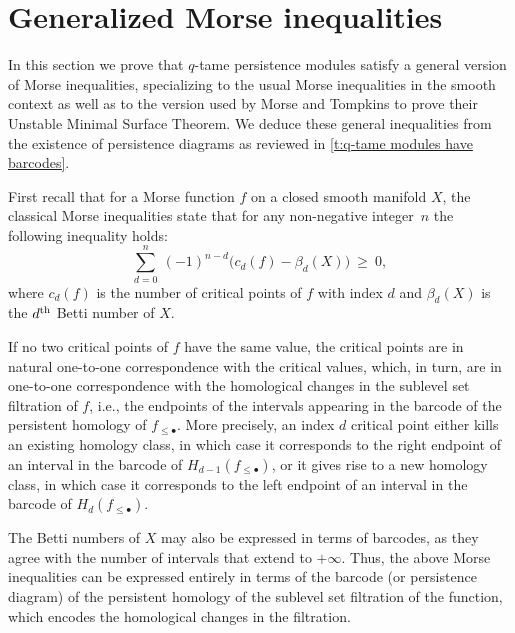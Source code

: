 
\section{Generalized Morse inequalities} \label{s:inequalities}

In this section we prove that $q$-tame persistence modules satisfy a general version of Morse inequalities, specializing to the usual Morse inequalities in the smooth context as well as to the version used by Morse and Tompkins to prove their Unstable Minimal Surface Theorem.
We deduce these general inequalities from the existence of persistence diagrams as reviewed in \cref{t:q-tame modules have barcodes}.

First recall that for a Morse function $f$ on a closed smooth manifold $X$, the classical Morse inequalities \cite{Morse.1925} state that for any non-negative integer~$n$ the following inequality holds:
\begin{equation} \label{e:classical morse inequalities}
\sum_{d=0}^n \ (-1)^{n-d} \big( c_{d}(f) - \beta_{d}(X) \big) \ \geq \ 0,
\end{equation}
where $c_d(f)$ is the number of critical points of $f$ with index $d$ and $\beta_{d}(X)$ is the $d^{\mathrm{th}}$ Betti number of $X$.

If no two critical points of $f$ have the same value, the critical points are in natural one-to-one correspondence with the critical values, which, in turn, are in one-to-one correspondence with the homological changes in the sublevel set filtration of $f$, i.e., the endpoints of the intervals appearing in the barcode of the persistent homology of $f_{\leq \bullet}$.
More precisely, an index $d$ critical point either kills an existing homology class, in which case it corresponds to the right endpoint of an interval in the barcode of $H_{d-1}(f_{\leq \bullet})$, or it gives rise to a new homology class, in which case it corresponds to the left endpoint of an interval in the barcode of $H_d(f_{\leq \bullet})$.

The Betti numbers of $X$ may also be expressed in terms of barcodes, as they agree with the number of intervals that extend to $+\infty$.
Thus, the above Morse inequalities can be expressed entirely in terms of the barcode (or persistence diagram) of the persistent homology of the sublevel set filtration of the function, which encodes the homological changes in the filtration.

